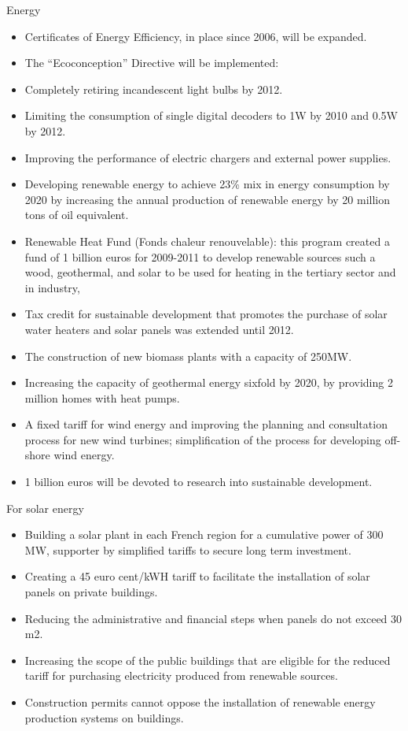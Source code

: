 Energy
\begin{itemize}
	\item Certificates of Energy Efficiency, in place since 2006, will be expanded.
	\item The “Ecoconception” Directive will be implemented:
	\item Completely retiring incandescent light bulbs by 2012.
	\item Limiting the consumption of single digital decoders to 1W by 2010 and 0.5W by 2012.
	\item Improving the performance of electric chargers and external power supplies.
	\item Developing renewable energy to achieve 23\% mix in energy consumption by 2020 by increasing the annual production of renewable energy by 20 million tons of oil equivalent.
	\item Renewable Heat Fund (Fonds chaleur renouvelable): this program created a fund of 1 billion euros for 2009-2011 to develop renewable sources such a wood, geothermal, and solar to be used for heating in the tertiary sector and in industry,
	\item Tax credit for sustainable development that promotes the purchase of solar water heaters and solar panels was extended until 2012.
	\item The construction of new biomass plants with a capacity of 250MW.
	\item Increasing the capacity of geothermal energy sixfold by 2020, by providing 2 million homes with heat pumps.
	\item A fixed tariff for wind energy and improving the planning and consultation process for new wind turbines; simplification of the process for developing off-shore wind energy.
	\item 1 billion euros will be devoted to research into sustainable development. 
\end{itemize}



For solar energy
\begin{itemize}
	\item Building a solar plant in each French region for a cumulative power of 300 MW, supporter by simplified tariffs to secure long term investment.
	\item Creating a 45 euro cent/kWH tariff to facilitate the installation of solar panels on private buildings.
	\item Reducing the administrative and financial steps when panels do not exceed 30 m2.
	\item Increasing the scope of the public buildings that are eligible for the reduced tariff for purchasing electricity produced from renewable sources.
	\item Construction permits cannot oppose the installation of renewable energy production systems on buildings.
\end{itemize}

